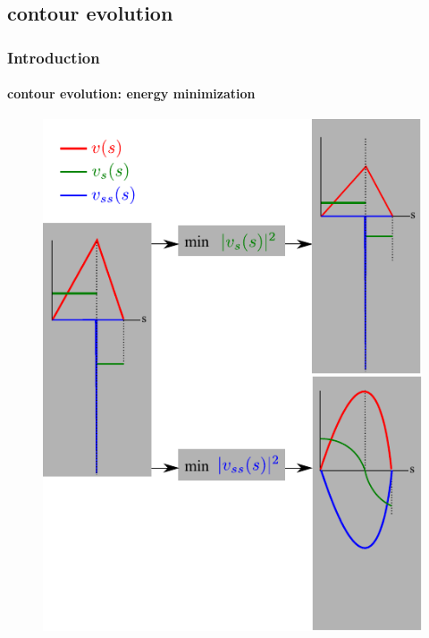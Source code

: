 \subsection{contour evolution}
\begin{frame}
\frametitle{Introduction}
\framesubtitle{contour evolution: energy minimization}
\logoCSIPCPL\mypagenum
	\begin{figure}
		\includegraphics[height=0.8\textheight]{figs/TRK_contours.pdf}
	\end{figure}
\end{frame}


